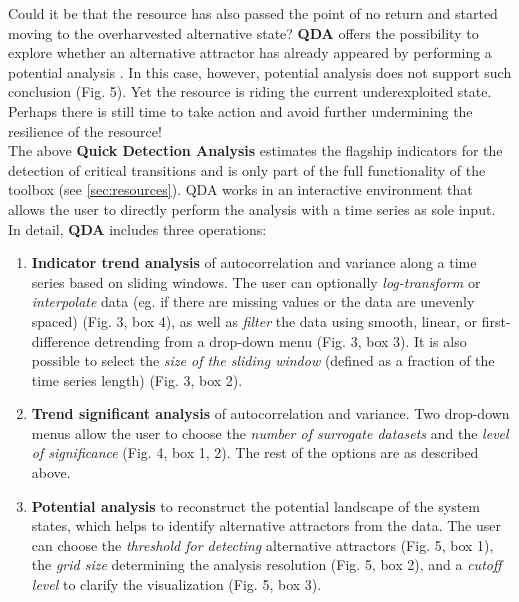 \documentclass[12pt,a4paper,final]{article}
\begin{document}
\begin{doublespacing}
Could it be that the resource has also passed the point of no return and started moving to the overharvested alternative state? \textbf{QDA} offers the possibility to explore whether an alternative attractor has already appeared by performing a potential analysis \cite{Kwasniok2009,Livina2010}. In this case, however, potential analysis does not support such conclusion (Fig. 5). Yet the resource is riding the current underexploited state. Perhaps there is still time to take action and avoid further undermining the resilience of the resource!\\


The above \textbf{Quick Detection Analysis} estimates the flagship indicators for the detection of critical transitions and is only part of the full functionality of the toolbox (see \ref{sec:resources}). QDA works in an interactive environment that allows the user to directly perform the analysis with a time series as sole input.
In detail, \textbf{QDA} includes three operations:
\begin{enumerate}
\item \textbf{Indicator trend analysis} of autocorrelation and variance along a time series based on sliding windows. The user can optionally \textit{log-transform} or \textit{interpolate} data (eg. if there are missing values or the data are unevenly spaced) (Fig. 3, box 4), as well as \textit{filter} the data using smooth, linear, or first-difference detrending from a drop-down menu (Fig. 3, box 3). It is also possible to select the \textit{size of the sliding window} (defined as a fraction of the time series length) (Fig. 3, box 2).
\item \textbf{Trend significant analysis} of autocorrelation and variance. Two drop-down menus allow the user to choose the \textit{number of surrogate datasets} and the \textit{level of significance} (Fig. 4, box 1, 2). The rest of the options are as described above.
\item \textbf{Potential analysis} to reconstruct the potential landscape of the system states, which helps to identify alternative attractors from the data. The user can choose the \textit{threshold for detecting} alternative attractors (Fig. 5, box 1), the \textit{grid size} determining the analysis resolution (Fig. 5, box 2), and a \textit{cutoff level} to clarify the visualization (Fig. 5, box 3).
\end{enumerate}


\end{doublespacing}
\end{document}
